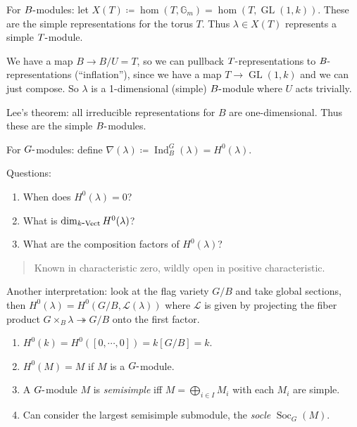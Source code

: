 For \(B{\hbox{-}}\)modules: let
\(X(T) \coloneqq\hom(T, {\mathbb{G}}_m) = \hom(T, \operatorname{GL}(1, k))\).
These are the simple representations for the torus \(T\). Thus
\(\lambda \in X(T)\) represents a simple \(T{\hbox{-}}\)module.

We have a map \(B \to B/U = T\), so we can pullback
\(T{\hbox{-}}\)representations to \(B{\hbox{-}}\)representations
(``inflation''), since we have a map \(T\to \operatorname{GL}(1, k)\)
and we can just compose. So \(\lambda\) is a 1-dimensional (simple)
\(B{\hbox{-}}\)module where \(U\) acts trivially.

Lee's theorem: all irreducible representations for \(B\) are
one-dimensional. Thus these are the simple \(B{\hbox{-}}\)modules.

For \(G{\hbox{-}}\)modules: define
\(\nabla(\lambda) \coloneqq\operatorname{Ind}_B^G(\lambda) = H^0(\lambda)\).

Questions:

\begin{enumerate}
\def\labelenumi{\arabic{enumi}.}
\tightlist
\item
  When does \(H^0(\lambda) = 0\)?
\item
  What is \(\dim_{k{\hbox{-}}\text{Vect}} H^0(\lambda)\)?
\item
  What are the composition factors of \(H^0(\lambda)\)?
\end{enumerate}

\begin{quote}
Known in characteristic zero, wildly open in positive characteristic.
\end{quote}

\begin{remark}

Another interpretation: look at the flag variety \(G/B\) and take global
sections, then \(H^0(\lambda) = H^0(G/B, \mathcal{L}(\lambda))\) where
\(\mathcal{L}\) is given by projecting the fiber product
\(G \times_B \lambda \twoheadrightarrow G/B\) onto the first factor.

\end{remark}

\begin{remark}

\hfill

\begin{enumerate}
\def\labelenumi{\arabic{enumi}.}
\tightlist
\item
  \(H^0(k) = H^0({\left[ {0, \cdots, 0} \right]}) = k[G/B] = k\).
\item
  \(H^0(M) = M\) if \(M\) is a \(G{\hbox{-}}\)module.
\item
  A \(G{\hbox{-}}\)module \(M\) is \emph{semisimple} iff
  \(M = \bigoplus_{i\in I} M_i\) with each \(M_i\) are simple.
\item
  Can consider the largest semisimple submodule, the \emph{socle}
  \(\operatorname{Soc}_G(M)\).
\end{enumerate}

\end{remark}

